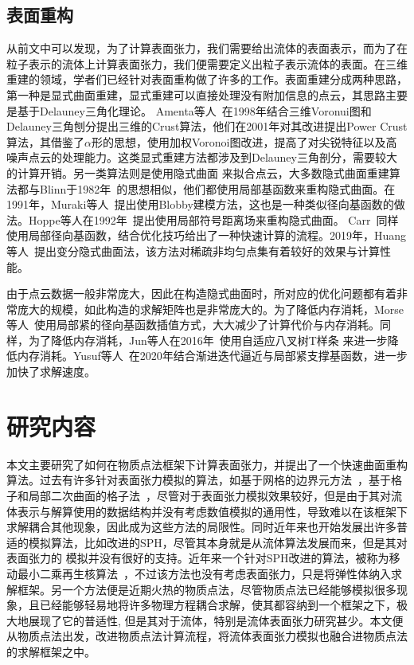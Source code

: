 \subsection{表面重构} 
从前文中可以发现，为了计算表面张力，我们需要给出流体的表面表示，而为了在粒子表示的流体上计算表面张力，我们便需要定义出粒子表示流体的表面。在三维重建的领域，学者们已经针对表面重构做了许多的工作。表面重建分成两种思路，第一种是显式曲面重建，显式重建可以直接处理没有附加信息的点云，其思路主要是基于Delauney三角化理论。
Amenta等人~\cite{amenta1998new}在1998年结合三维Voronui图和Delauney三角刨分提出三维的Crust算法，他们在2001年对其改进提出Power Crust算法，其借鉴了$\alpha$形的思想，使用加权Voronoi图改进，提高了对尖锐特征以及高噪声点云的处理能力。这类显式重建方法都涉及到Delauney三角剖分，需要较大的计算开销。另一类算法则是使用隐式曲面
来拟合点云，大多数隐式曲面重建算法都与Blinn于1982年~\cite{blinn1982generalization}的思想相似，他们都使用局部基函数来重构隐式曲面。在1991年，Muraki等人~\cite{muraki1991volumetric}提出使用Blobby建模方法，这也是一种类似径向基函数的做法。Hoppe等人在1992年~\cite{hoppe1992surface}提出使用局部符号距离场来重构隐式曲面。
Carr~\cite{carr2001reconstruction}同样使用局部径向基函数，结合优化技巧给出了一种快速计算的流程。2019年，Huang等人~\cite{huang2019variational}提出变分隐式曲面法，该方法对稀疏非均匀点集有着较好的效果与计算性能。

由于点云数据一般非常庞大，因此在构造隐式曲面时，所对应的优化问题都有着非常庞大的规模，如此构造的求解矩阵也是非常庞大的。为了降低内存消耗，Morse等人~\cite{morse2005interpolating}使用局部紧的径向基函数插值方式，大大减少了计算代价与内存消耗。同样，为了降低内存消耗，Jun等人在2016年~\cite{wang2010adaptive}使用自适应八叉树T样条
来进一步降低内存消耗。Yusuf等人~\cite{hamza2020implicit}在2020年结合渐进迭代逼近与局部紧支撑基函数，进一步加快了求解速度。
\section{研究内容}
本文主要研究了如何在物质点法框架下计算表面张力，并提出了一个快速曲面重构算法。过去有许多针对表面张力模拟的算法，如基于网格的边界元方法~\cite{da2016surface}，基于格子和局部二次曲面的格子法~\cite{wang2020codimensional}，尽管对于表面张力模拟效果较好，但是由于其对流体表示与解算使用的数据结构并没有考虑数值模拟的通用性，导致难以在该框架下求解耦合其他现象，因此成为这些方法的局限性。同时近年来也开始发展出许多普适的模拟算法，比如改进的SPH，尽管其本身就是从流体算法发展而来，但是其对表面张力的
模拟并没有很好的支持。近年来一个针对SPH改进的算法，被称为移动最小二乘再生核算法~\cite{chen2020moving}，不过该方法也没有考虑表面张力，只是将弹性体纳入求解框架。另一个方法便是近期火热的物质点法，尽管物质点法已经能够模拟很多现象，且已经能够轻易地将许多物理方程耦合求解，使其都容纳到一个框架之下，极大地展现了它的普适性,
但是其对于流体，特别是流体表面张力研究甚少。本文便从物质点法出发，改进物质点法计算流程，将流体表面张力模拟也融合进物质点法的求解框架之中。

